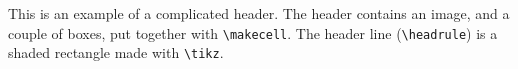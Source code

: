\documentclass{article}
\renewcommand{\headrule}{%
  \tikz \fill [left color=green,right color=yellow] (0,0) rectangle (\headwidth,2.5pt);
}
\begin{document}
This is an example of a complicated header. The header contains an image, and a couple of boxes, put together with \verb|\makecell|. The header line (\verb|\headrule|) is a shaded rectangle made with \verb|\tikz|.

\bigskip

\lipsum[1-3]
\end{document}

